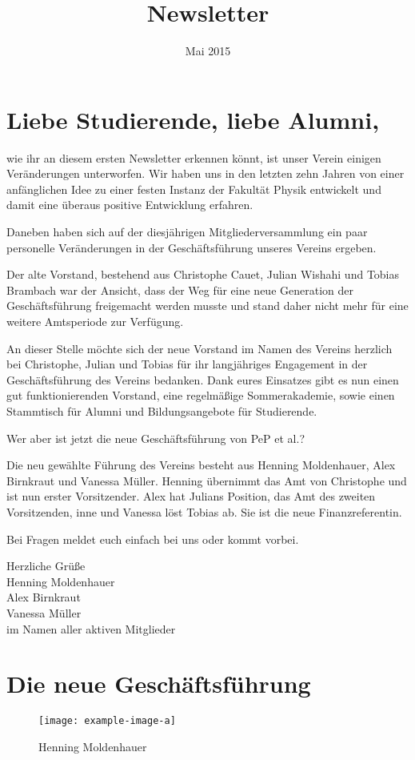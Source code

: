 \documentclass{pepnewsletter}
\title{Newsletter}
\date{Mai 2015}
\begin{document}
\section*{Liebe Studierende, liebe Alumni,}
wie ihr an diesem ersten Newsletter erkennen könnt, ist unser Verein einigen Veränderungen unterworfen. Wir haben uns in den letzten zehn Jahren von einer anfänglichen Idee zu einer festen Instanz der Fakultät Physik entwickelt und damit eine überaus positive Entwicklung erfahren.

Daneben haben sich auf der diesjährigen Mitgliederversammlung ein paar personelle Veränderungen in der Geschäftsführung unseres Vereins ergeben.

Der alte Vorstand, bestehend aus Christophe Cauet, Julian Wishahi und Tobias Brambach war der Ansicht, dass der Weg für eine neue Generation der Geschäftsführung freigemacht werden musste und stand daher nicht mehr für eine weitere Amtsperiode zur Verfügung.

An dieser Stelle möchte sich der neue Vorstand im Namen des Vereins herzlich bei Christophe, Julian und Tobias für ihr langjähriges Engagement in der Geschäftsführung des Vereins bedanken. Dank eures Einsatzes gibt es nun einen gut funktionierenden Vorstand, eine regelmäßige Sommerakademie, sowie einen Stammtisch für Alumni und Bildungsangebote für Studierende.

Wer aber ist jetzt die neue Geschäftsführung von PeP et al.?

Die neu gewählte Führung des Vereins besteht aus Henning Moldenhauer, Alex Birnkraut und Vanessa Müller.
Henning übernimmt das Amt von Christophe und ist nun erster Vorsitzender. Alex hat Julians Position, das Amt des zweiten Vorsitzenden, inne und Vanessa löst Tobias ab. Sie ist die neue Finanzreferentin.

Bei Fragen meldet euch einfach bei uns oder kommt vorbei.

Herzliche Grüße\\[1ex]
Henning Moldenhauer\\
Alex Birnkraut\\
Vanessa Müller\\
im Namen aller aktiven Mitglieder

\section*{Die neue Geschäftsführung}

\begin{wrapfigure}{r}{.21\textwidth}
	\vspace{-20pt}
	\begin{center}
		\texttt{[image: example-image-a]}
	\end{center}
	\vspace{-20pt}
	\caption*{Henning Moldenhauer}
	\vspace{-10pt}
\end{wrapfigure}
\end{document}
